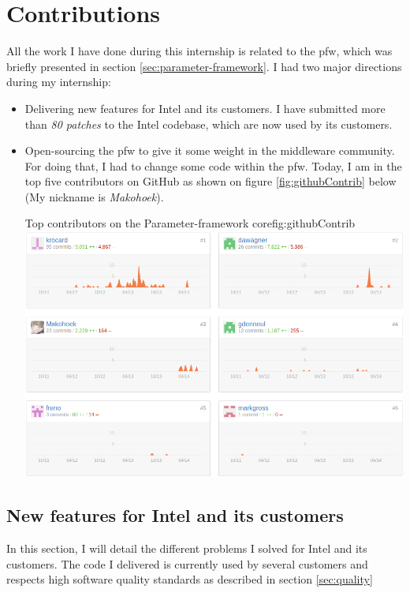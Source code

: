 \chapter{Contributions}\label{chap:contributions}

All the work I have done during this internship is related to the \gls{pfw},
which was briefly presented in section \ref{sec:parameter-framework}.
I had two major directions during my internship:
\begin{itemize}
    \item Delivering new features for Intel and its customers.
        I have submitted more than \emph{80 patches} to the Intel codebase, which are now used by its customers.
    \item Open-sourcing the \gls{pfw} to give it some weight in the middleware community.
        For doing that, I had to change some code within the \gls{pfw}.
        Today, I am in the top five contributors on GitHub as shown on figure \ref{fig:githubContrib} below (My nickname is \emph{Makohoek}).
        \begin{figureGraphics}{Top contributors on the Parameter-framework core}{fig:githubContrib}
            \includegraphics[width=\textwidth]{./src/img/statsGitHub.png}
        \end{figureGraphics}
\end{itemize}

\section{New features for Intel and its customers}

In this section, I will detail the different problems I solved for Intel and its customers.
The code I delivered is currently used by several customers and respects high software quality standards
as described in section \ref{sec:quality}

